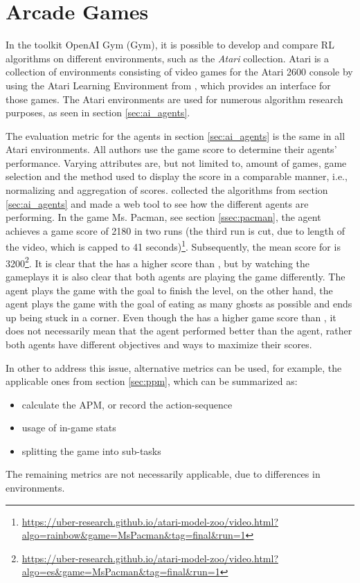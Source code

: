 \section{Arcade Games} \label{sec:arcgames}
In the toolkit OpenAI Gym (Gym), it is possible to develop and compare RL algorithms on different environments, such as the \textit{Atari} collection. Atari is a collection of environments consisting of video games for the Atari 2600 console \cite{1606.01540} by using the Atari Learning Environment from , which provides an interface for those games. The Atari environments are used for numerous algorithm research purposes, as seen in section \ref{sec:ai_agents}.

The evaluation metric for the agents in section \ref{sec:ai_agents} is the same in all Atari environments. All authors use the game score to determine their agents' performance. Varying attributes are, but not limited to, amount of games, game selection and the method used to display the score in a comparable manner, i.e., normalizing and aggregation of scores.  collected the algorithms from section \ref{sec:ai_agents} and made a web tool to see how the different agents are performing. In the game Ms. Pacman, see section \ref{ssec:pacman}, the  agent achieves a game score of 2180 in two runs (the third run is cut, due to length of the video, which is capped to 41 seconds)\footnote{\url{https://uber-research.github.io/atari-model-zoo/video.html?algo=rainbow&game=MsPacman&tag=final&run=1}}. Subsequently, the mean score for  is 3200\footnote{\url{https://uber-research.github.io/atari-model-zoo/video.html?algo=es&game=MsPacman&tag=final&run=1}}. It is clear that the  has a higher score than , but by watching the gameplays it is also clear that both agents are playing the game differently. The  agent plays the game with the goal to finish the level, on the other hand, the  agent plays the game with the goal of eating as many ghosts as possible and ends up being stuck in a corner. Even though the  has a higher game score than , it does not necessarily mean that the  agent performed better than the  agent, rather both agents have different objectives and ways to maximize their scores.

In other to address this issue, alternative metrics can be used, for example, the applicable ones from section \ref{sec:ppm}, which can be summarized as:
\begin{itemize}
	\item calculate the APM, or record the action-sequence
	\item usage of in-game stats
	\item splitting the game into sub-tasks
\end{itemize}
The remaining metrics are not necessarily applicable, due to differences in environments.

